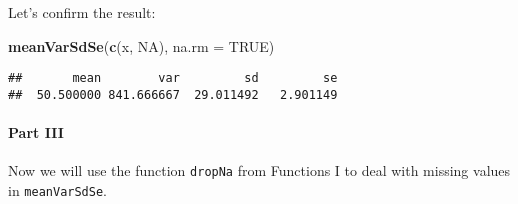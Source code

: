 \documentclass[11,]{article}
\newenvironment{Shaded}{\begin{snugshade}}{\end{snugshade}}
\newcommand{\KeywordTok}[1]{\textcolor[rgb]{0.13,0.29,0.53}{\textbf{{#1}}}}
\newcommand{\DataTypeTok}[1]{\textcolor[rgb]{0.13,0.29,0.53}{{#1}}}
\newcommand{\OtherTok}[1]{\textcolor[rgb]{0.56,0.35,0.01}{{#1}}}
\newcommand{\NormalTok}[1]{{#1}}
\begin{document}
Let's confirm the result:

\begin{Shaded}
\begin{Highlighting}[]
\KeywordTok{meanVarSdSe}\NormalTok{(}\KeywordTok{c}\NormalTok{(x, }\OtherTok{NA}\NormalTok{), }\DataTypeTok{na.rm =} \OtherTok{TRUE}\NormalTok{)}
\end{Highlighting}
\end{Shaded}

\begin{verbatim}
##       mean        var         sd         se 
##  50.500000 841.666667  29.011492   2.901149
\end{verbatim}

\paragraph{Part III}\label{part-iii}

Now we will use the function \texttt{dropNa} from Functions I to deal
with missing values in \texttt{meanVarSdSe}.
\end{document}
